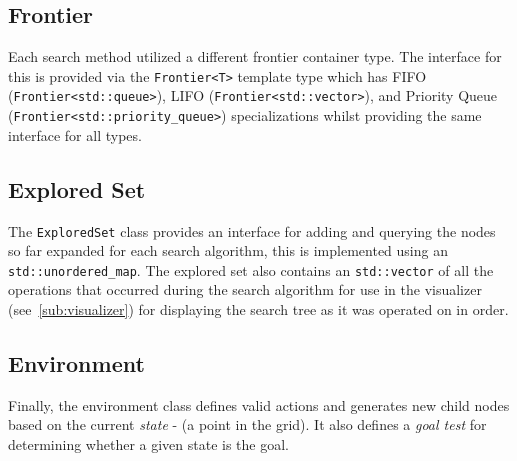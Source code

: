 \subsection{Frontier} %
\label{sub:frontier}
Each search method utilized a different frontier container type. The interface for this is provided via the \texttt{Frontier<T>} template type which has FIFO (\texttt{Frontier<std::queue>}), LIFO (\texttt{Frontier<std::vector>}), and Priority Queue (\texttt{Frontier<std::priority_queue>}) specializations whilst providing the same interface for all types.

\subsection{Explored Set} %
\label{sub:exploredset}
The \texttt{ExploredSet} class provides an interface for adding and querying the nodes so far expanded for each search algorithm, this is implemented using an \texttt{std::unordered_map}. The explored set also contains an \texttt{std::vector} of all the operations that occurred during the search algorithm for use in the visualizer (see~\ref{sub:visualizer}) for displaying the search tree as it was operated on in order.

\subsection{Environment} %
\label{sub:environment}
Finally, the environment class defines valid actions and generates new child nodes based on the current \textit{state} - (a point in the grid). It also defines a \textit{goal test} for determining whether a given state is the goal.


